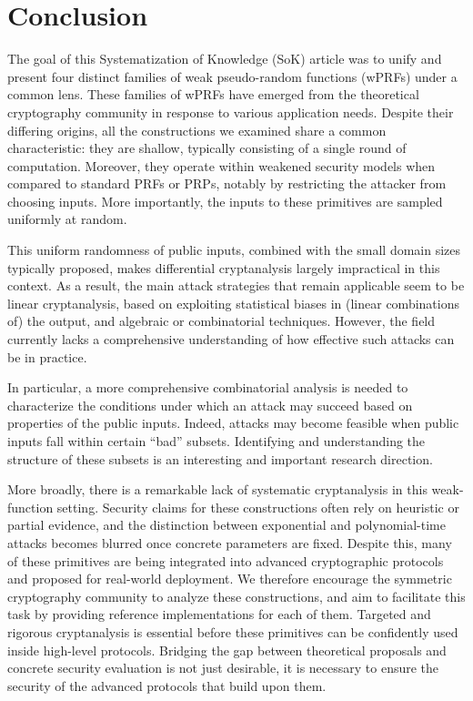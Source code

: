 \section{Conclusion}
\label{sec:conclusion}



The goal of this Systematization of Knowledge (SoK) article was to unify and present four distinct families of weak pseudo-random functions (wPRFs) under a common lens. These families of wPRFs have emerged from the theoretical cryptography community in response to various application needs. Despite their differing origins, all the constructions we examined share a common characteristic: they are shallow, typically consisting of a single round of computation. Moreover, they operate within weakened security models when compared to standard PRFs or PRPs, notably by restricting the attacker from choosing inputs. More importantly, the inputs to these primitives  are sampled uniformly at random.

This uniform randomness of public inputs, combined with the small domain sizes typically proposed, makes differential cryptanalysis largely impractical in this context. As a result, the main attack strategies that remain applicable seem to be linear cryptanalysis, based on exploiting statistical biases in (linear combinations of) the output, and algebraic or combinatorial techniques. However, the field currently lacks a comprehensive understanding of how effective such attacks can be in practice.

In particular, a more comprehensive combinatorial analysis is needed to characterize the conditions under which an attack may succeed based on properties of the public inputs. Indeed, attacks may become feasible when public inputs fall within certain ``bad'' subsets. Identifying and understanding the structure of these subsets is an interesting and important research direction.

More broadly, there is a remarkable lack of systematic cryptanalysis in this weak-function setting. Security claims for these constructions often rely on heuristic or partial evidence, and the distinction between exponential and polynomial-time attacks becomes blurred once concrete parameters are fixed. Despite this, many of these primitives are being integrated into advanced cryptographic protocols and proposed for real-world deployment. We therefore encourage the symmetric cryptography community to analyze these constructions, and aim to facilitate this task by providing reference implementations for each of them. Targeted and rigorous cryptanalysis is essential before these primitives can be confidently used inside high-level protocols. Bridging the gap between theoretical proposals and concrete security evaluation is not just desirable,  it is necessary to ensure the security of the advanced protocols that build upon them.

